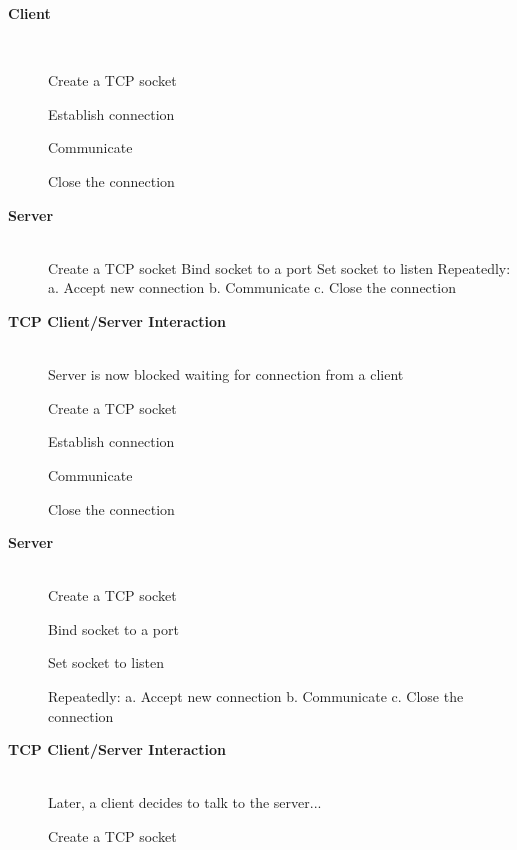 \begin{description}
\os{\newpage}\item[{\rot\bf  Client }]~\\[-3ex]

\begin{enumerate}
  \ite Create a TCP socket

  \ite Establish connection

  \ite Communicate

  \ite Close the connection

\end{enumerate}


\os{\newpage}\item[{\rot\bf  Server }]~\\[-3ex]

Create a TCP socket Bind socket to a port Set socket to listen Repeatedly:
a. Accept new connection
b. Communicate
c. Close the connection


\os{\newpage}\item[{\rot\bf  TCP Client/Server Interaction }]~\\[-3ex]

Server is now blocked waiting for connection from a client



\begin{enumerate}
  \ite Create a TCP socket

  \ite Establish connection

  \ite Communicate

  \ite Close the connection

\end{enumerate}


\os{\newpage}\item[{\rot\bf  Server }]~\\[-3ex]

Create a TCP socket

Bind socket to a port

Set socket to listen

Repeatedly:
a. Accept new connection
b. Communicate
c. Close the connection


\os{\newpage}\item[{\rot\bf  TCP Client/Server Interaction }]~\\[-3ex]

Later, a client decides to talk to the server...



\begin{enumerate}
  \ite Create a TCP socket


\end{enumerate}
\end{description}
